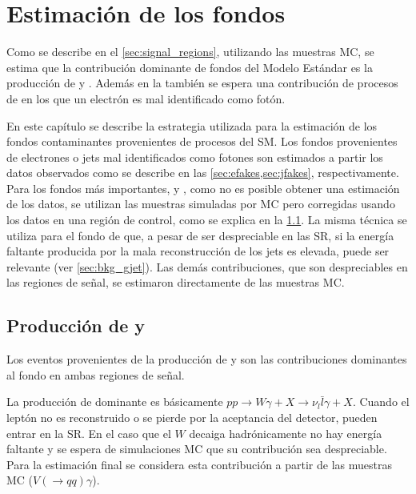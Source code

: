 \chapter{Estimación de los fondos} \label{cap:fondos}

Como se describe en el \cref{sec:signal_regions}, utilizando las
muestras MC, se estima que la contribución dominante de fondos del Modelo
Estándar es la producción de {\wgam} y {\ttgam}. Además en la {\SRL} también se
espera una contribución de procesos de {\ttbar} en los que un electrón es mal
identificado como fotón.

En este capítulo se describe la estrategia utilizada para la estimación de los
fondos contaminantes provenientes de procesos del SM.
Los fondos provenientes de electrones o jets mal identificados como fotones son
estimados a partir los datos observados como se describe en las
\cref{sec:efakes,sec:jfakes}, respectivamente. %
Para los fondos más importantes, {\wgam} y
{\ttgam}, como no es posible obtener una estimación de los datos, se
utilizan las muestras simuladas por MC pero corregidas usando los datos en
una región de control, como se explica en la \cref{sec:bkg_wgam_ttgam}. La
misma técnica se utiliza para el fondo de {\gjet} que, a pesar de ser
despreciable en las SR, si la energía faltante producida por la mala
reconstrucción de los jets es elevada, puede ser relevante (ver
\cref{sec:bkg_gjet}). Las demás contribuciones, que son despreciables en
las regiones de señal, se estimaron directamente de las muestras MC.



\section[Producción de {\wgam} y $tt\gamma$]{Producción de {\wgam} y {\ttgam}}
\label{sec:bkg_wgam_ttgam}

Los eventos provenientes de la producción de {\wgam} y {\ttgam} son las
contribuciones dominantes al fondo en ambas regiones de señal.

La producción de {\wgam} dominante es básicamente $pp \to W\gamma + X \to \nu_l
\bar{l}\gamma + X$. Cuando el leptón no es reconstruido o se pierde por la
aceptancia del detector, pueden entrar en la SR. En el caso que el $W$
decaiga hadrónicamente no hay energía faltante y se espera de simulaciones MC que
su contribución sea despreciable. Para la estimación final se considera
esta contribución a partir de las muestras MC ($V(\to qq)\gamma$).

